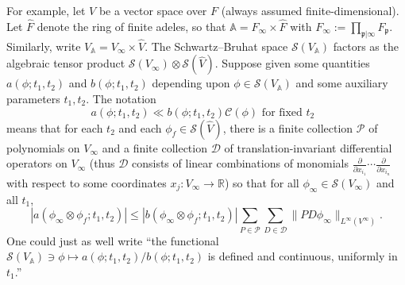 \documentclass[reqno,10pt]{amsart}
\theoremstyle{plain} %
\theoremstyle{definition}
\theoremstyle{plain} %
\theoremstyle{remark}
\theoremstyle{itplain} %
\theoremstyle{remark} %
\renewcommand{\leq}{\leqslant}
\numberwithin{equation}{section}
\begin{document}
For example, let $V$ be a vector space over $F$ (always assumed finite-dimensional).  Let $\hat{F}$ denote the ring of finite adeles, so that $\mathbb{A} = F_\infty \times \hat{F}$ with $F_\infty := \prod_{\mathfrak{p} | \infty} F_\mathfrak{p}$.  Similarly, write $V_\mathbb{A} = V_\infty \times \hat{V}$.  The Schwartz--Bruhat space $\mathcal{S}(V_\mathbb{A})$ factors as the algebraic tensor product $\mathcal{S}(V_\infty) \otimes \mathcal{S}(\hat{V})$.  Suppose given some quantities $a(\phi;t_1,t_2)$ and $b(\phi;t_1,t_2)$ depending upon $\phi \in \mathcal{S}(V_\mathbb{A})$ and some auxiliary parameters $t_1,t_2$.  The notation
\begin{equation}\label{eq:example-a-phi-bounded-by-C-phi}
  a(\phi;t_1,t_2)
  \ll b(\phi;t_1,t_2) \mathcal{C}(\phi) \text{ for fixed $t_2$ }
\end{equation}
means that for each $t_2$ and each $\phi_f \in \mathcal{S}(\hat{V})$, there is a finite collection $\mathcal{P}$ of polynomials on $V_\infty$ and a finite collection $\mathcal{D}$ of translation-invariant differential operators on $V_\infty$ (thus $\mathcal{D}$ consists of linear combinations of monomials $\frac{\partial }{\partial x_{i_1}} \dotsb \frac{\partial }{\partial x_{i_n}}$ with respect to some coordinates $x_j : V_\infty \rightarrow \mathbb{R}$) so that for all $\phi_\infty \in \mathcal{S}(V_\infty)$ and all $t_1$,
\[
  | a(\phi_\infty \otimes \phi_f;t_1,t_2) | \leq |b(\phi_\infty \otimes \phi_f;t_1,t_2)| \sum_{P \in \mathcal{P}} \sum_{D \in \mathcal{D}} \|P D \phi_\infty \|_{L^\infty(V^\infty)}.
\]
One could just as well write ``the functional $\mathcal{S}(V_\mathbb{A}) \ni \phi \mapsto a(\phi;t_1,t_2)/b(\phi;t_1,t_2)$ is defined and continuous, uniformly in $t_1$.''
\end{document}
